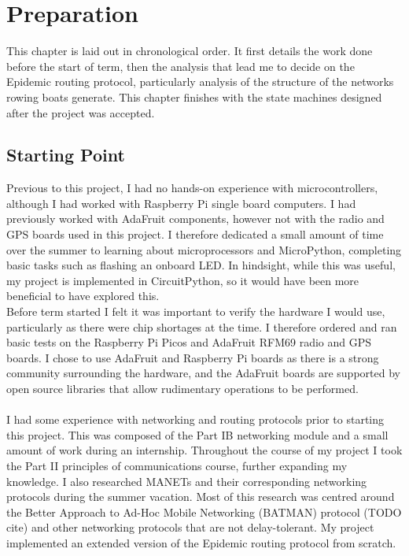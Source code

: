 \documentclass[12pt,a4paper]{report}
\newcommand{\newchapter}[2]{
    \setcounter{chapter}{#1}
    \setcounter{section}{0}
    \chapter*{#2}
    \addcontentsline{toc}{chapter}{#1 #2}
}
\begin{document}
\newchapter{2}{Preparation}
This chapter is laid out in chronological order. It first details the work done before the start of term, then the analysis that lead me to decide on the Epidemic routing protocol, particularly analysis of the structure of the networks rowing boats generate. This chapter finishes with the state machines designed after the project was accepted.

\section{Starting Point} 
Previous to this project, I had no hands-on experience with microcontrollers, although I had worked with Raspberry Pi single board computers. I had previously worked with AdaFruit components, however not with the radio and GPS boards used in this project. I therefore dedicated a small amount of time over the summer to learning about microprocessors and MicroPython, completing basic tasks such as flashing an onboard LED. In hindsight, while this was useful, my project is implemented in CircuitPython, so it would have been more beneficial to have explored this. \\ 
Before term started I felt it was important to verify the hardware I would use, particularly as there were chip shortages at the time. I therefore ordered and ran basic tests on the Raspberry Pi Picos and AdaFruit RFM69 radio and GPS boards. I chose to use AdaFruit and Raspberry Pi boards as there is a strong community surrounding the hardware, and the AdaFruit boards are supported by open source libraries that allow rudimentary operations to be performed. \\ \\ 
I had some experience with networking and routing protocols prior to starting this project. This was composed of the Part IB networking module and a small amount of work during an internship. Throughout the course of my project I took the Part II principles of communications course, further expanding my knowledge. I also researched MANETs and their corresponding networking protocols during the summer vacation. Most of this research was centred around the Better Approach to Ad-Hoc Mobile Networking (BATMAN) protocol (TODO cite) and other networking protocols that are not delay-tolerant. My project implemented an extended version of the Epidemic routing protocol from scratch. 
\end{document}
